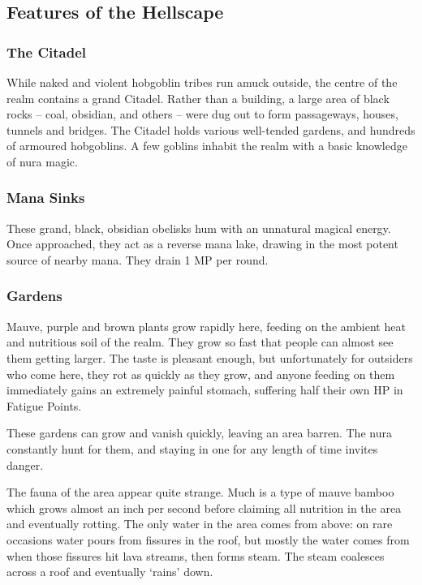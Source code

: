\begin{multicols}{2}
\subsection{Features of the Hellscape}

\subsubsection{The Citadel}

While naked and violent hobgoblin tribes run amuck outside, the centre of the realm contains a grand Citadel.
Rather than a building, a large area of black rocks  -- coal, obsidian, and others -- were dug out to form passageways, houses, tunnels and bridges.
The Citadel holds various well-tended gardens, and hundreds of armoured hobgoblins.
A few goblins inhabit the realm with a basic knowledge of nura magic.

\subsubsection{Mana Sinks}

These grand, black, obsidian obelisks hum with an unnatural magical energy.
Once approached, they act as a reverse mana lake, drawing in the most potent source of nearby mana.
They drain 1 MP per round.

\subsubsection{Gardens}

Mauve, purple and brown plants grow rapidly here, feeding on the ambient heat and nutritious soil of the realm.  They grow so fast that people can almost see them getting larger.  The taste is pleasant enough, but unfortunately for outsiders who come here, they rot as quickly as they grow, and anyone feeding on them immediately gains an extremely painful stomach, suffering half their own HP in Fatigue Points.

These gardens can grow and vanish quickly, leaving an area barren.
The nura constantly hunt for them, and staying in one for any length of time invites danger.

The fauna of the area appear quite strange. Much is a type of mauve bamboo which grows almost an inch per second before claiming all nutrition in the area and eventually rotting.  The only water in the area comes from above: on rare occasions water pours from fissures in the roof, but mostly the water comes from when those fissures hit lava streams, then forms steam.  The steam coalesces across a roof and eventually `rains' down.


\end{multicols}
